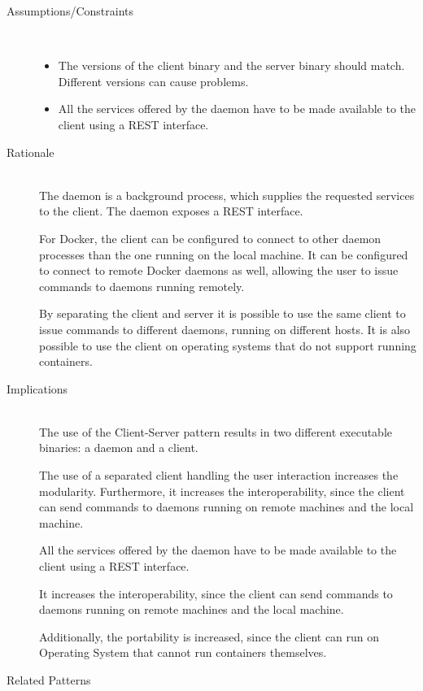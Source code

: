 \begin{description}
\item [Assumptions/Constraints]~
\begin{itemize}
\item The versions of the client binary and the server binary should match. Different versions can cause problems.
\item All the services offered by the daemon have to be made available to the client using a REST interface.
\end{itemize}

\item [Rationale] ~\\
The daemon is a background process, which supplies the requested services to the client. The daemon exposes a REST interface.

For Docker, the client can be configured to connect to other daemon processes than the one running on the local machine. It can be configured to connect to remote Docker daemons as well, allowing the user to issue commands to daemons running remotely.


By separating the client and server it is possible to use the same client to issue commands to different daemons, running on different hosts.
It is also possible to use the client on operating systems that do not support running containers.

\item [Implications]~\\
The use of the Client-Server pattern results in two different executable binaries: a daemon and a client. 


The use of a separated client handling the user interaction increases the modularity.
Furthermore, it increases the interoperability, since the client can send commands to daemons running on remote machines and the local machine.

All the services offered by the daemon have to be made available to the client using a REST interface.

It increases the interoperability, since the client can send commands to daemons running on remote machines and the local machine.

Additionally, the portability is increased, since the client can run on Operating System that cannot run containers themselves.


\item [Related Patterns]~\\


\end{description}

